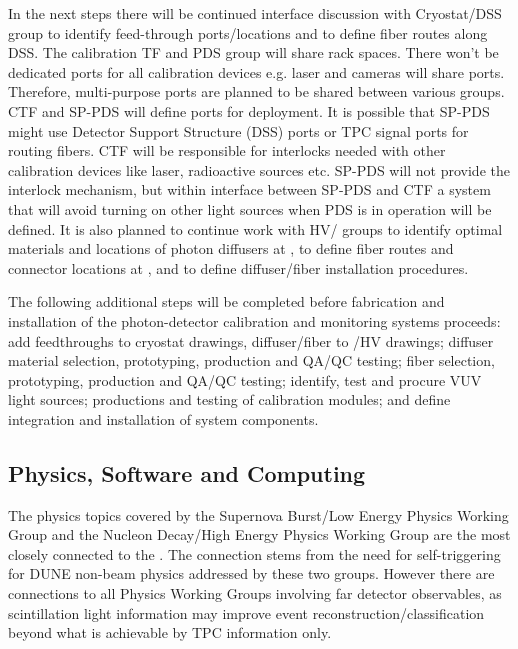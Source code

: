 
In the next steps there will be continued interface discussion with Cryostat/DSS group to identify feed-through ports/locations and to define fiber routes along DSS. The calibration TF and PDS group will share rack spaces. There won't be dedicated ports for all calibration devices e.g. laser and cameras will share ports. 
Therefore, multi-purpose ports are planned to be shared between various groups. CTF and SP-PDS will define ports for deployment. It is possible that SP-PDS might use Detector Support Structure (DSS) ports or TPC signal ports for routing fibers. CTF will be responsible for interlocks needed with other calibration devices 
like laser, radioactive sources etc. SP-PDS will not provide the interlock mechanism, but within interface between SP-PDS and CTF a system that will avoid turning  on other light sources when PDS is in operation will be defined.
It is also planned to continue work with HV/ groups to identify optimal materials and locations of photon diffusers at , to define fiber routes and connector locations  at , and to define diffuser/fiber installation procedures.

The following additional steps will be completed before fabrication and installation of the photon-detector calibration and monitoring systems proceeds: add feedthroughs to cryostat drawings, diffuser/fiber to /HV drawings; diffuser material selection, prototyping, production and QA/QC testing; fiber selection, prototyping, production and QA/QC testing; identify, test and procure VUV light sources; productions and testing of calibration modules; and define integration and installation of system components.


\subsection{Physics, Software and Computing}


The physics topics covered by the Supernova Burst/Low Energy Physics Working Group and the Nucleon Decay/High Energy Physics Working Group are the most closely connected to the \single {}. The connection stems from the need for self-triggering for DUNE non-beam physics addressed by these two groups. 
However there are connections to all Physics Working Groups involving far detector observables, as scintillation light information may improve event reconstruction/classification beyond what is achievable by TPC information only. 


